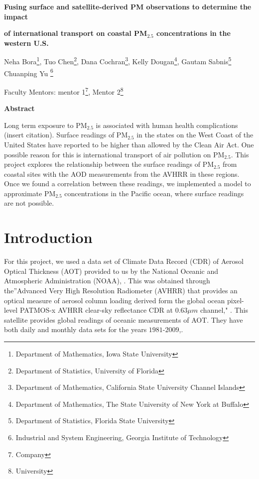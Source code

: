\documentclass[10pt]{article}
\begin{document}
\centerline{\large \bf Fusing surface and satellite-derived PM observations to determine the impact } 

\centerline{\large \bf of international transport on coastal PM$_{2.5}$ concentrations in the western U.S.}

\vspace{.1truein}

\def\thefootnote{\arabic{footnote}}
\begin{center}
  Neha Bora\footnote{Department of Mathematics, Iowa State University},
  Tuo Chen\footnote{Department of Statistics, University of Florida},
  Dana Cochran\footnote{Department of Mathematics, California State University Channel Islands},
  Kelly Dougan\footnote{Department of Mathematics, The State University of New York at Buffalo},
  Gautam Sabnis\footnote{Department of Statistics, Florida State University}
  Chuanping Yu \footnote{Industrial and System Engineering, Georgia Institute of Technology}
\end{center}


\begin{center}
Faculty Mentors: mentor 1\footnote{Company},
Mentor 2\footnote{University}
\end{center}


\vspace{.3truein}
\centerline{\bf Abstract}

Long term exposure to PM$_{2.5}$ is associated with human health complications (insert citation). Surface readings of PM$_{2.5}$ in the states on the West Coast of the United States have reported to be higher than allowed by the Clean Air Act. One possible reason for this is international transport of air pollution on PM$_{2.5}$. This project explores the relationship between the surface readings of PM$_{2.5}$ from coastal sites with the AOD measurements from the AVHRR in these regions. Once we found a correlation between these readings, we implemented a model to approximate PM$_{2.5}$ concentrations in the Pacific ocean, where surface readings are not possible.

\section{Introduction}
For this project, we used a data set of Climate Data Record (CDR) of Aerosol Optical Thickness (AOT) provided to us by the National Oceanic and Atmospheric Administration (NOAA), \cite{noaa}. This was obtained through the''Advanced Very High Resolution Radiometer (AVHRR) that provides an optical measure of aerosol column loading derived form the global ocean pixel-level PATMOS-x AVHRR clear-sky reflectance CDR at $0.63\mu m$ channel," \cite{noaa}. This satellite provides global readings of oceanic measurements of AOT. They have both daily and monthly data sets for the years $1981$-$2009$,\cite{noaa}.
\end{document}
